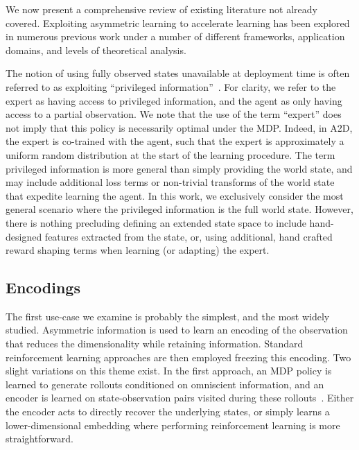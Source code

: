 We now present a comprehensive review of existing literature not already covered.  Exploiting asymmetric learning to accelerate learning has been explored in numerous previous work under a number of different frameworks, application domains, and levels of theoretical analysis.

The notion of using fully observed states unavailable at deployment time is often referred to as exploiting ``privileged information''~\citep{vapnik2009new, lambert2018deep}.  For clarity, we refer to the expert as having access to privileged information, and the agent as only having access to a partial observation.  We note that the use of the term ``expert'' does not imply that this policy is necessarily optimal under the MDP.  Indeed, in A2D, the expert is co-trained with the agent, such that the expert is approximately a uniform random distribution at the start of the learning procedure.  The term privileged information is more general than simply providing the world state, and may include additional loss terms or non-trivial transforms of the world state that expedite learning the agent.  In this work, we exclusively consider the most general scenario where the privileged information is the full world state.  However, there is nothing precluding defining an extended state space to include hand-designed features extracted from the state, or, using additional, hand crafted reward shaping terms when learning (or adapting) the expert. 

\subsection{Encodings}
The first use-case we examine is probably the simplest, and the most widely studied.  Asymmetric information is used to learn an encoding of the observation that reduces the dimensionality while retaining information.  Standard reinforcement learning approaches are then employed freezing this encoding.  Two slight variations on this theme exist.  In the first approach, an MDP policy is learned to generate rollouts conditioned on omniscient information, and an encoder is learned on state-observation pairs visited during these rollouts~\citep{Finn2016, Levine2016}.  Either the encoder acts to directly recover the underlying states, or simply learns a lower-dimensional embedding where performing reinforcement learning is more straightforward.

